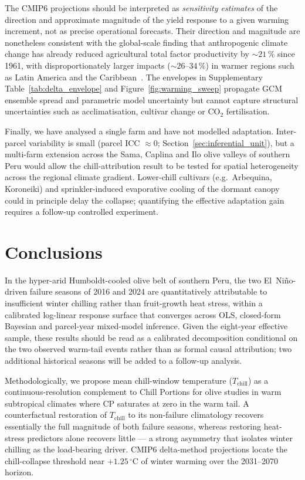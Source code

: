 \documentclass[agronomy,article,submit,pdftex,moreauthors]{Definitions/mdpi}
\begin{document}
The CMIP6 projections should be interpreted as \emph{sensitivity estimates} of the direction and approximate magnitude of the yield response to a given warming increment, not as precise operational forecasts. Their direction and magnitude are nonetheless consistent with the global-scale finding that anthropogenic climate change has already reduced agricultural total factor productivity by ${\sim}21\,\%$ since 1961, with disproportionately larger impacts (${\sim}26$--$34\,\%$) in warmer regions such as Latin America and the Caribbean~\cite{ortizbobea2021}. The envelopes in Supplementary Table~\ref{tab:delta_envelope} and Figure~\ref{fig:warming_sweep} propagate GCM ensemble spread and parametric model uncertainty but cannot capture structural uncertainties such as acclimatisation, cultivar change or CO$_{2}$ fertilisation.

Finally, we have analysed a single farm and have not modelled adaptation. Inter-parcel variability is small (parcel ICC $\approx 0$; Section~\ref{sec:inferential_unit}), but a multi-farm extension across the Sama, Caplina and Ilo olive valleys of southern Peru would allow the chill-attribution result to be tested for spatial heterogeneity across the regional climate gradient. Lower-chill cultivars (e.g.\ Arbequina, Koroneiki) and sprinkler-induced evaporative cooling of the dormant canopy~\cite{erez2024} could in principle delay the collapse; quantifying the effective adaptation gain requires a follow-up controlled experiment.

\section{Conclusions}
\label{sec:conclusions}

In the hyper-arid Humboldt-cooled olive belt of southern Peru, the two El~Ni\~{n}o-driven failure seasons of 2016 and 2024 are quantitatively attributable to insufficient winter chilling rather than fruit-growth heat stress, within a calibrated log-linear response surface that converges across OLS, closed-form Bayesian and parcel-year mixed-model inference. Given the eight-year effective sample, these results should be read as a calibrated decomposition conditional on the two observed warm-tail events rather than as formal causal attribution; two additional historical seasons will be added to a follow-up analysis.

Methodologically, we propose mean chill-window temperature ($T_{\text{chill}}$) as a continuous-resolution complement to Chill Portions for olive studies in warm subtropical climates where CP saturates at zero in the warm tail. A counterfactual restoration of $T_{\text{chill}}$ to its non-failure climatology recovers essentially the full magnitude of both failure seasons, whereas restoring heat-stress predictors alone recovers little --- a strong asymmetry that isolates winter chilling as the load-bearing driver. CMIP6 delta-method projections locate the chill-collapse threshold near $+1.25\,^\circ$C of winter warming over the 2031--2070 horizon.
\end{document}
